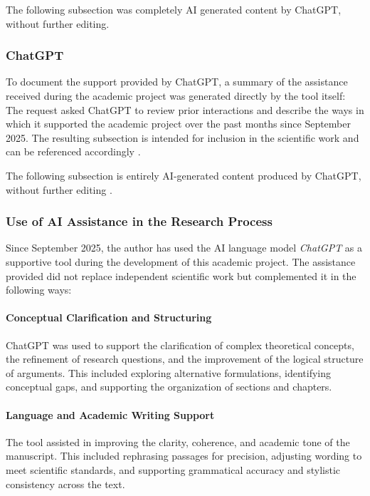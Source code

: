The following subsection was completely AI generated content by ChatGPT, without further editing.
{\itshape
\subsubsection*{ChatGPT}

To document the support provided by ChatGPT, a summary of the assistance received during the academic project was generated directly by the tool itself:
The request asked ChatGPT to review prior interactions and describe the ways in which it supported the academic project over the past months since September 2025. The resulting subsection is intended for inclusion in the scientific work and can be referenced accordingly \cite{chatgpt_ai_assistance_2025}.



The following subsection is entirely AI-generated content produced by ChatGPT, without further editing  \cite{chatgpt_ai_assistance_2025}.

\subsubsection*{Use of AI Assistance in the Research Process}

Since September 2025, the author has used the AI language model \emph{ChatGPT} as a supportive tool during the development of this academic project. The assistance provided did not replace independent scientific work but complemented it in the following ways:

\paragraph{Conceptual Clarification and Structuring}
ChatGPT was used to support the clarification of complex theoretical concepts, the refinement of research questions, and the improvement of the logical structure of arguments. This included exploring alternative formulations, identifying conceptual gaps, and supporting the organization of sections and chapters.

\paragraph{Language and Academic Writing Support}
The tool assisted in improving the clarity, coherence, and academic tone of the manuscript. This included rephrasing passages for precision, adjusting wording to meet scientific standards, and supporting grammatical accuracy and stylistic consistency across the text.

}
